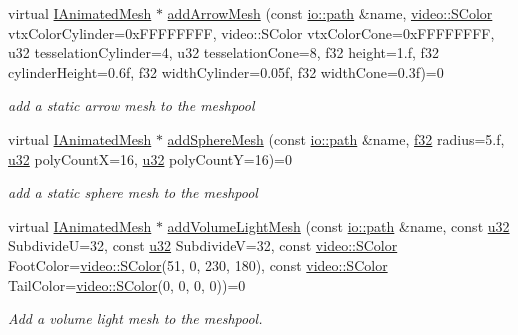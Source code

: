 \begin{DoxyCompactItemize}
virtual \hyperlink{classirr_1_1scene_1_1IAnimatedMesh}{I\+Animated\+Mesh} $\ast$ \hyperlink{classirr_1_1scene_1_1ISceneManager_ac1bca43a6301e6c9daf09806ea46309a}{add\+Arrow\+Mesh} (const \hyperlink{namespaceirr_1_1io_ab1bdc45edb3f94d8319c02bc0f840ee1}{io\+::path} \&name, \hyperlink{classirr_1_1video_1_1SColor}{video\+::\+S\+Color} vtx\+Color\+Cylinder=0x\+F\+F\+F\+F\+F\+F\+F\+F, video\+::\+S\+Color vtx\+Color\+Cone=0x\+F\+F\+F\+F\+F\+F\+F\+F, u32 tesselation\+Cylinder=4, u32 tesselation\+Cone=8, f32 height=1.\+f, f32 cylinder\+Height=0.\+6f, f32 width\+Cylinder=0.\+05f, f32 width\+Cone=0.\+3f)=0
\begin{DoxyCompactList}\small\item\em add a static arrow mesh to the meshpool \end{DoxyCompactList}\item 
virtual \hyperlink{classirr_1_1scene_1_1IAnimatedMesh}{I\+Animated\+Mesh} $\ast$ \hyperlink{classirr_1_1scene_1_1ISceneManager_a9e9e8524055ca841c0bb16316f4b8212}{add\+Sphere\+Mesh} (const \hyperlink{namespaceirr_1_1io_ab1bdc45edb3f94d8319c02bc0f840ee1}{io\+::path} \&name, \hyperlink{namespaceirr_a0277be98d67dc26ff93b1a6a1d086b07}{f32} radius=5.f, \hyperlink{namespaceirr_a0416a53257075833e7002efd0a18e804}{u32} poly\+CountX=16, \hyperlink{namespaceirr_a0416a53257075833e7002efd0a18e804}{u32} poly\+CountY=16)=0
\begin{DoxyCompactList}\small\item\em add a static sphere mesh to the meshpool \end{DoxyCompactList}\item 
virtual \hyperlink{classirr_1_1scene_1_1IAnimatedMesh}{I\+Animated\+Mesh} $\ast$ \hyperlink{classirr_1_1scene_1_1ISceneManager_a7086c554b86bdf055d6ebcc5950e1f16}{add\+Volume\+Light\+Mesh} (const \hyperlink{namespaceirr_1_1io_ab1bdc45edb3f94d8319c02bc0f840ee1}{io\+::path} \&name, const \hyperlink{namespaceirr_a0416a53257075833e7002efd0a18e804}{u32} SubdivideU=32, const \hyperlink{namespaceirr_a0416a53257075833e7002efd0a18e804}{u32} SubdivideV=32, const \hyperlink{classirr_1_1video_1_1SColor}{video\+::\+S\+Color} Foot\+Color=\hyperlink{classirr_1_1video_1_1SColor}{video\+::\+S\+Color}(51, 0, 230, 180), const \hyperlink{classirr_1_1video_1_1SColor}{video\+::\+S\+Color} Tail\+Color=\hyperlink{classirr_1_1video_1_1SColor}{video\+::\+S\+Color}(0, 0, 0, 0))=0
\begin{DoxyCompactList}\small\item\em Add a volume light mesh to the meshpool. \end{DoxyCompactList}\item 

\end{DoxyCompactItemize}
